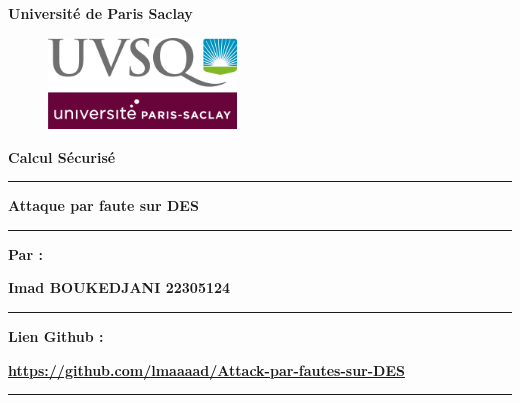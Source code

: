 \documentclass[12pt,a4paper]{report}
\begin{document}
\begin{titlepage}


 \begin{center}
	\textbf{\centering  Université de Paris Saclay } 

\end{center}

	
	

\begin{figure}[h]
    \centering
    \includegraphics[width=5cm]{images/UVSQlogo.png}
\end{figure}
	\vspace{2cm}

\begin{center}
	\Huge{\textbf{Calcul Sécurisé}	}
\end{center}

\vspace{2cm}
\hrule	
\begin{center}
\Huge{\textbf{ Attaque par faute sur DES }	}
\end{center}
\hrule
\vspace{1cm}
\begin{center}
	\Large{\textbf{Par :} }
	
\end{center}

\begin{center}
\large{\textbf{Imad BOUKEDJANI 22305124}}
\end{center}

\vspace{1cm}

\hrule

\begin{center}
\large{\textbf{Lien Github : } } 
\end{center}
\vspace{1cm}

\begin{center} 
\large{\textbf{\href{https://github.com/lmaaaad/Attack-par-fautes-sur-DES}{https://github.com/lmaaaad/Attack-par-fautes-sur-DES} }}
\end{center}
\hrule

\end{titlepage}
\end{document}
